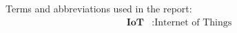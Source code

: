 
Terms and abbreviations used in the report:
\begin{align*}
    \textbf{IoT} &: \text{Internet of Things} \\
\end{align*}
